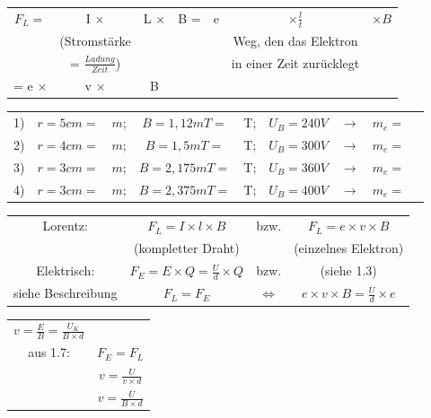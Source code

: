 \documentclass{report}
\begin{document}
	\begin{table}[h]		
		\begin{tabular}{ccccccc}
			$F_L =$ & I $\times$ & L $\times$ & B = & e & $\times \frac{l}{t}$ & $\times B$ \\
			 & (Stromstärke  & & & & Weg, den das Elektron & \\
			 & = $\frac{Ladung}{Zeit}$) & & & & in einer Zeit zurücklegt & \\
			 \hline
			 = e $\times$ & v $\times$ & B & & 
		\end{tabular}
	\end{table}
	
	\begin{table}[h]
		\begin{tabular}{ccccccccc}
			1) & $r=5cm=$ & $m$; & $B=1,12mT=$ & T; & $U_B=240V$ & $\to$ & $m_e=$ \\
			2) & $r=4cm=$ & $m$; & $B=1,5mT=$ & T; & $U_B=300V$ & $\to$ & $m_e=$ \\
			3) & $r=3cm=$ & $m$; & $B=2,175mT=$ & T; & $U_B=360V$ & $\to$ & $m_e=$ \\
			4) & $r=3cm=$ & $m$; & $B=2,375mT=$ & T; & $U_B=400V$ & $\to$ & $m_e=$ \\
		\end{tabular}
	\end{table}
	\newpage
	\begin{table}[h]
		\begin{tabular}{cccc}
			Lorentz: &$F_L = I \times l \times B$ & bzw. & $F_L = e \times v \times B$ \\
			&(kompletter Draht) & & (einzelnes Elektron) \\
			Elektrisch: &$F_E = E \times Q = \frac{U}{d} \times Q$ & bzw. & (siehe 1.3) \\
			siehe Beschreibung & $F_L = F_E$ & $\Leftrightarrow$ & $e \times v \times B = \frac{U}{d} \times e$ \\
		\end{tabular}
	\end{table}
	
	\newpage
	
	\begin{table}[h]
		\begin{tabular}{cc}
			$v = \frac{E}{B} = \frac{U_K}{B \times d}$ & \\
			aus 1.7: & $F_E = F_L$ \\
			& $v = \frac{U}{v \times d}$ \\
			& $v = \frac{U}{B \times d}$ \\
		\end{tabular}
	\end{table}
	
	
\end{document}
